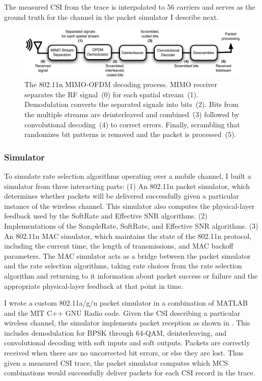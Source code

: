 The measured CSI from the trace is interpolated to 56 carriers and serves as the ground truth for the channel in the packet simulator I describe next.
\begin{figure}[ht]
\centering
\includegraphics[width=6in]{figures/esnr/mimo_ofdm_decoding_process.pdf}
\caption[The 802.11n MIMO-OFDM decoding process]{\label{fig:ofdm_decoding} The 802.11n MIMO-OFDM decoding process. MIMO receiver separates the RF signal~(0) for each spatial stream~(1). Demodulation converts the separated signals into bits~(2). Bits from the multiple streams are deinterleaved and combined~(3) followed by convolutional decoding~(4) to correct errors. Finally, scrambling that randomizes bit patterns is removed and the packet is processed~(5).}
\end{figure}


\subsubsection{Simulator}
To simulate rate selection algorithms operating over a mobile channel, I built a simulator from three interacting parts: (1) An 802.11n packet simulator, which determines whether packets will be delivered successfully given a particular instance of the wireless channel. This simulator also computes the physical-layer feedback used by the SoftRate and Effective SNR algorithms. (2) Implementations of the SampleRate, SoftRate, and Effective SNR algorithms. (3) An 802.11n MAC simulator, which maintains the state of the 802.11n protocol, including the current time, the length of transmissions, and MAC backoff parameters. The MAC simulator acts as a bridge between the packet simulator and the rate selection algorithms, taking rate choices from the rate selection algorithm and returning to it information about packet success or failure and the appropriate physical-layer feedback at that point in time.

I wrote a custom 802.11a/g/n packet simulator in a combination of MATLAB and the MIT C++ GNU Radio code. Given the CSI describing  a particular wireless channel, the simulator implements packet reception as shown in . This includes demodulation for BPSK through 64-QAM, deinterleaving, and convolutional decoding with soft inputs and soft outputs. Packets are correctly received when there are no uncorrected bit errors, or else they are lost. Thus given a measured CSI trace, the packet simulator computes which MCS combinations would successfully deliver packets for each CSI record in the trace.

